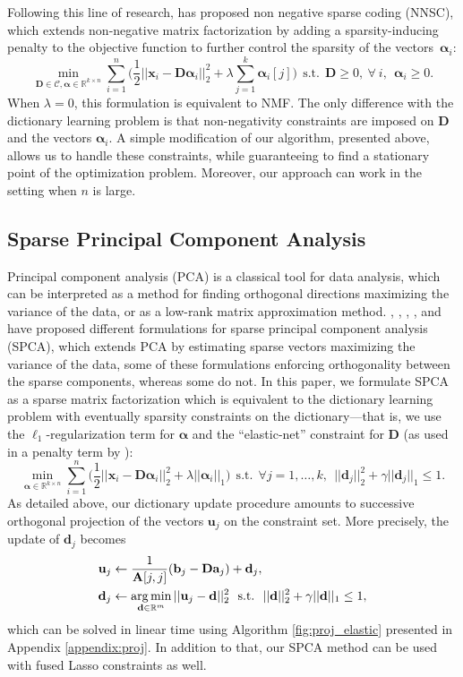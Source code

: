 \documentclass[twoside,11pt]{article}
\def\x{{\mathbf x}}
\def\a{{\mathbf a}}
\def\alphab{{\boldsymbol\alpha}}
\def\D{{\mathbf D}}
\def\d{{\mathbf d}}
\def\C{{\mathcal C}}
\def\d{{\mathbf d}}
\def\b{{\mathbf b}}
\def\u{{\mathbf u}}
\def\Real{{\mathbb R}}
\def\u{{\mathbf u}}
\def\A{{\mathbf A}}
\def\argmin{\operatornamewithlimits{arg\,min}}
\def\st{~~\text{s.t.}~~}
\begin{document}
Following this
line of research, \citet{hoyer,hoyer2} has proposed non negative sparse coding
(NNSC), which extends non-negative matrix factorization by adding a
sparsity-inducing penalty to the objective function to further control the sparsity of the vectors~$\alphab_i$:
\begin{displaymath}
   \min_{\D \in \C, \alphab \in \Real^{k \times n}} \sum_{i=1}^n \Big(\frac{1}{2}||\x_i-\D\alphab_i||_2^2 + \lambda \sum_{j=1}^k \alphab_i[j]\Big) \st \D \geq 0,~\forall~i,~~ \alphab_i \geq 0.
\end{displaymath}
When $\lambda = 0$, this formulation is equivalent to NMF.
The only difference with the dictionary learning problem is that
non-negativity constraints are imposed on $\D$ and the vectors $\alphab_i$.
A simple modification of our algorithm, presented above, allows us to handle
these constraints, while guaranteeing to
find a stationary point of the optimization problem. Moreover,
our approach can work in the setting when $n$ is large.
\subsection{Sparse Principal Component Analysis}
Principal component analysis (PCA) is a classical tool for data analysis,
which can be interpreted as a method for finding orthogonal directions maximizing
the variance of the data, or as a low-rank matrix approximation method.
\citet{jolliffe}, \citet{zou2}, \citet{aspremont}, \citet{bach2}, \citet{witten} and \citet{zass} have proposed different formulations
for sparse principal component analysis (SPCA), which extends PCA by
estimating sparse vectors maximizing the variance of the data,
some of these formulations enforcing orthogonality between the sparse
components, whereas some do not.  In this paper, we formulate SPCA as a
sparse matrix factorization which is equivalent to the dictionary learning
problem with eventually sparsity constraints on the dictionary---that is, we
use the $\ell_1$-regularization term for $\alphab$ and the ``elastic-net''
constraint for $\D$ (as used in a penalty term by \citealt{zou2}):
\begin{displaymath}
   \min_{\alphab \in \Real^{k \times n}} \sum_{i=1}^n
   \Big(\frac{1}{2}||\x_i-\D\alphab_i||_2^2 + \lambda||\alphab_i||_1\Big) \st \forall
   j=1,\ldots,k,~~ ||\d_j||_2^2 + \gamma||\d_j||_1 \leq 1.%
\end{displaymath}
As detailed above, our dictionary update procedure amounts to successive
orthogonal projection of the vectors $\u_j$ on the constraint set. More
precisely, the update of $\d_j$ becomes 
\begin{displaymath}
\begin{split}
   \u_j &\leftarrow \frac{1}{\A[j,j]}(\b_j-\D\a_j) + \d_j, \\
   \d_j &\leftarrow \argmin_{\d \in \Real^m} ||\u_j-\d||_2^2 \st  ||\d||_2^2 + \gamma||\d||_1 \leq 1,
\end{split}
\end{displaymath}
which can be solved in linear time using Algorithm \ref{fig:proj_elastic}
presented in Appendix \ref{appendix:proj}.  In addition to that, our SPCA
method can be used with fused Lasso constraints as well.
\end{document}
